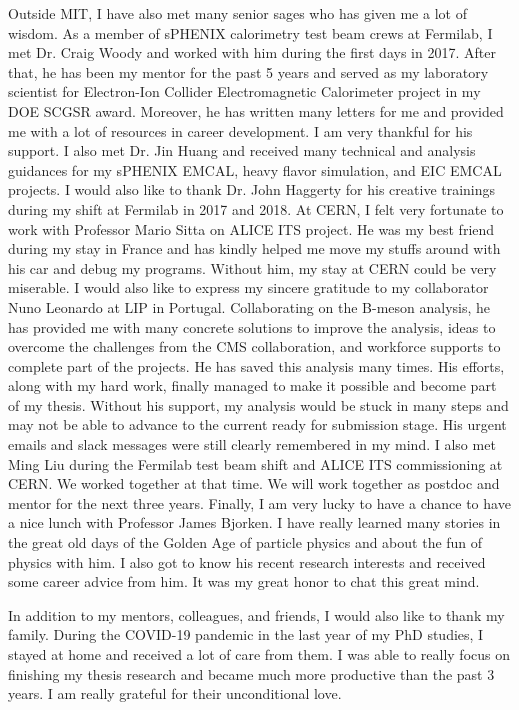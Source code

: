 Outside MIT, I have also met many senior sages who has given me a lot of wisdom. As a member of sPHENIX calorimetry test beam crews at Fermilab, I met Dr. Craig Woody and worked with him during the first days in 2017. After that, he has been my mentor for the past 5 years and served as my laboratory scientist for Electron-Ion Collider Electromagnetic Calorimeter project in my DOE SCGSR award. Moreover, he has written many letters for me and provided me with a lot of resources in career development. I am very thankful for his support. I also met Dr. Jin Huang and received many technical and analysis guidances for my sPHENIX EMCAL, heavy flavor simulation, and EIC EMCAL projects. I would also like to thank Dr. John Haggerty for his creative trainings during my shift at Fermilab in 2017 and 2018. At CERN, I felt very fortunate to work with Professor Mario Sitta on ALICE ITS project. He was my best friend during my stay in France and has kindly helped me move my stuffs around with his car and debug my programs. Without him, my stay at CERN could be very miserable. I would also like to express my sincere gratitude to my collaborator Nuno Leonardo at LIP in Portugal. Collaborating on the B-meson analysis, he has provided me with many concrete solutions to improve the analysis, ideas to overcome the challenges from the CMS collaboration, and workforce supports to complete part of the projects. He has saved this analysis many times. His efforts, along with my hard work, finally managed to make it possible and become part of my thesis. Without his support, my analysis would be stuck in many steps and may not be able to advance to the current ready for submission stage. His urgent emails and slack messages were still clearly remembered in my mind. I also met Ming Liu during the Fermilab test beam shift and ALICE ITS commissioning at CERN. We worked together at that time. We will work together as postdoc and mentor for the next three years. Finally, I am very lucky to have a chance to have a nice lunch with Professor James Bjorken. I have really learned many stories in the great old days of the Golden Age of particle physics and about the fun of physics with him. I also got to know his recent research interests and received some career advice from him. It was my great honor to chat this great mind.

In addition to my mentors, colleagues, and friends, I would also like to thank my family. During the COVID-19 pandemic in the last year of my PhD studies, I stayed at home and received a lot of care from them. I was able to really focus on finishing my thesis research and became much more productive than the past 3 years. I am really grateful for their unconditional love. 

